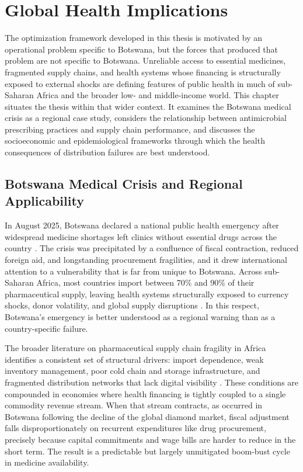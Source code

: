 \documentclass{article}
\begin{document}
\section{Global Health Implications}

The optimization framework developed in this thesis is motivated by an operational problem specific to Botswana, but the forces that produced that problem are not specific to Botswana. Unreliable access to essential medicines, fragmented supply chains, and health systems whose financing is structurally exposed to external shocks are defining features of public health in much of sub-Saharan Africa and the broader low- and middle-income world. This chapter situates the thesis within that wider context. It examines the Botswana medical crisis as a regional case study, considers the relationship between antimicrobial prescribing practices and supply chain performance, and discusses the socioeconomic and epidemiological frameworks through which the health consequences of distribution failures are best understood.

\subsection{Botswana Medical Crisis and Regional Applicability}

In August 2025, Botswana declared a national public health emergency after widespread medicine shortages left clinics without essential drugs across the country \cite{reut25}. The crisis was precipitated by a confluence of fiscal contraction, reduced foreign aid, and longstanding procurement fragilities, and it drew international attention to a vulnerability that is far from unique to Botswana. Across sub-Saharan Africa, most countries import between 70\% and 90\% of their pharmaceutical supply, leaving health systems structurally exposed to currency shocks, donor volatility, and global supply disruptions \cite{adebisi2022}. In this respect, Botswana's emergency is better understood as a regional warning than as a country-specific failure.

The broader literature on pharmaceutical supply chain fragility in Africa identifies a consistent set of structural drivers: import dependence, weak inventory management, poor cold chain and storage infrastructure, and fragmented distribution networks that lack digital visibility \cite{olutuase2022}. These conditions are compounded in economies where health financing is tightly coupled to a single commodity revenue stream. When that stream contracts, as occurred in Botswana following the decline of the global diamond market, fiscal adjustment falls disproportionately on recurrent expenditures like drug procurement, precisely because capital commitments and wage bills are harder to reduce in the short term. The result is a predictable but largely unmitigated boom-bust cycle in medicine availability.
\end{document}
